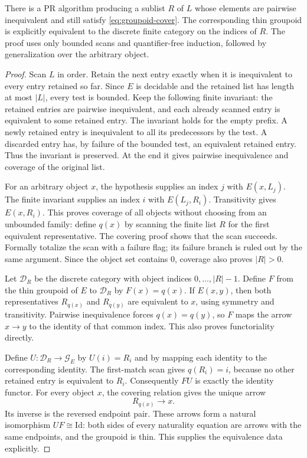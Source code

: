 \begin{theorem}
\label{thm:finite-cover-skeleton}
There is a PR algorithm producing a sublist $R$ of $L$ whose elements
are pairwise inequivalent and still satisfy \eqref{eq:groupoid-cover}.
The corresponding thin groupoid is explicitly equivalent to the
discrete finite category on the indices of $R$. The proof uses only
bounded scans and quantifier-free induction, followed by generalization
over the arbitrary object.
\end{theorem}

\begin{proof}
Scan $L$ in order. Retain the next entry exactly when it is inequivalent
to every entry retained so far. Since $E$ is decidable and the retained
list has length at most $|L|$, every test is bounded. Keep the following
finite invariant: the retained entries are pairwise inequivalent, and
each already scanned entry is equivalent to some retained entry.
The invariant holds for the empty prefix. A newly retained entry is
inequivalent to all its predecessors by the test. A discarded entry
has, by failure of the bounded test, an equivalent retained entry.
Thus the invariant is preserved. At the end it gives pairwise
inequivalence and coverage of the original list.

For an arbitrary object $x$, the hypothesis supplies an index $j$ with
$E(x,L_j)$. The finite invariant supplies an index $i$ with
$E(L_j,R_i)$. Transitivity gives $E(x,R_i)$. This proves coverage of
all objects without choosing from an unbounded family: define $q(x)$
by scanning the finite list $R$ for the first equivalent representative.
The covering proof shows that the scan succeeds. Formally totalize the
scan with a failure flag; its failure branch is ruled out by the same
argument. Since the object set contains $0$, coverage also proves
$|R|>0$.

Let $\mathcal D_R$ be the discrete category with object indices
$0,\ldots,|R|-1$. Define $F$ from the thin groupoid of $E$ to
$\mathcal D_R$ by $F(x)=q(x)$. If $E(x,y)$, then both representatives
$R_{q(x)}$ and $R_{q(y)}$ are equivalent to $x$, using symmetry and
transitivity. Pairwise inequivalence forces $q(x)=q(y)$, so $F$ maps
the arrow $x\to y$ to the identity of that common index. This also
proves functoriality directly.

Define $U:\mathcal D_R\to\mathcal G_E$ by $U(i)=R_i$ and by mapping
each identity to the corresponding identity. The first-match scan gives
$q(R_i)=i$, because no other retained entry is equivalent to $R_i$.
Consequently $FU$ is exactly the identity functor. For every object $x$,
the covering relation gives the unique arrow
\[
                       R_{q(x)}\longrightarrow x.
\]
Its inverse is the reversed endpoint pair. These arrows form a natural
isomorphism $UF\cong\mathrm{Id}$: both sides of every naturality
equation are arrows with the same endpoints, and the groupoid is thin.
This supplies the equivalence data explicitly.


\end{proof}
